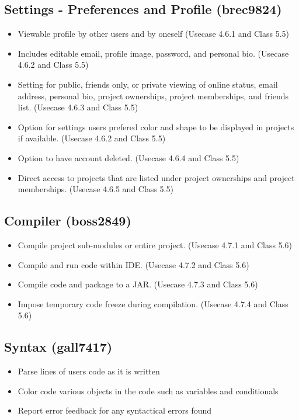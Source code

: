 \documentclass[11pt]{report}
\begin{document}
    \subsection{Settings - Preferences and Profile (brec9824)}
        \begin{itemize}
            \item Viewable profile by other users and by oneself (Usecase 4.6.1 and Class 5.5)
            \item Includes editable email, profile image, password, and personal bio. (Usecase 4.6.2 and Class 5.5)
            \item Setting for public, friends only, or private viewing of online status, email address, personal bio, project ownerships, project memberships, and friends list. (Usecase 4.6.3 and Class 5.5)
            \item Option for settings users prefered color and shape to be displayed in projects if available. (Usecase 4.6.2 and Class 5.5)
            \item Option to have account deleted. (Usecase 4.6.4 and Class 5.5)
        	\item Direct access to projects that are listed under project ownerships and project memberships. (Usecase 4.6.5 and Class 5.5)
        \end{itemize}
    \subsection{Compiler (boss2849)}
        \begin{itemize}
            \item Compile project sub-modules or entire project. (Usecase 4.7.1 and Class 5.6)
            \item Compile and run code within IDE. (Usecase 4.7.2 and Class 5.6)
            \item Compile code and package to a JAR. (Usecase 4.7.3 and Class 5.6)
            \item Impose temporary code freeze during compilation. (Usecase 4.7.4 and Class 5.6)
        \end{itemize}
    \subsection{Syntax (gall7417)}
        \begin{itemize}
            \item Parse lines of users code as it is written
            \item Color code various objects in the code such as variables and conditionals
            \item Report error feedback for any syntactical errors found
        \end{itemize}
\end{document}
